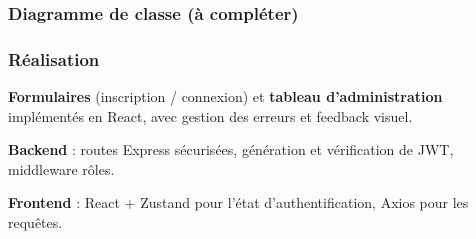 \subsubsection{Diagramme de classe (à compléter)}

\subsubsection{Réalisation}
\noindent\textbf{Formulaires} (inscription / connexion) et \textbf{tableau d’administration} implémentés en React, avec gestion des erreurs et feedback visuel.

\noindent\textbf{Backend} : routes Express sécurisées, génération et vérification de JWT, middleware rôles.

\noindent\textbf{Frontend} : React + Zustand pour l’état d’authentification, Axios pour les requêtes.

